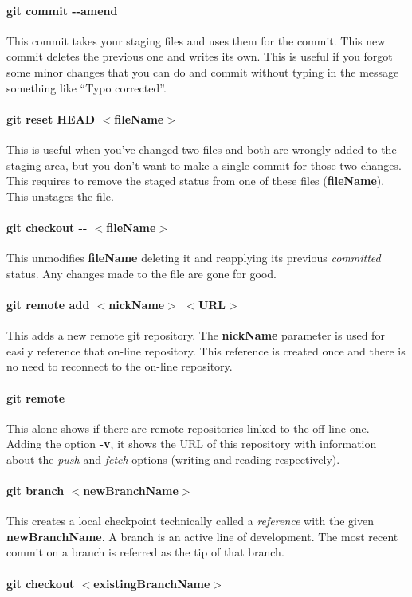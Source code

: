 \documentclass[a4paper, 12pt]{article}
\begin{document}
\paragraph{git commit -{}-amend} This commit takes your staging files and uses them for the commit. This new commit deletes the previous one and writes its own. This is useful if you forgot some minor changes that you can do and commit without typing in the message something like ``Typo corrected''.

\paragraph{git reset HEAD $<$fileName$>$} This is useful when you've changed two files and both are wrongly added to the staging area, but you don't want to make a single commit for those two changes. This requires to remove the staged status from one of these files (\textbf{fileName}). This unstages the file.

\paragraph{git checkout -{}- $<$fileName$>$} This unmodifies \textbf{fileName} deleting it and reapplying its previous \emph{committed} status. Any changes made to the file are gone for good.

\paragraph{git remote add $<$nickName$>$ $<$URL$>$}  This adds a new remote git repository. The \textbf{nickName} parameter is used for easily reference that on-line repository. This reference is created once and there is no need to reconnect to the on-line repository.

\paragraph{git remote} This alone shows if there are remote repositories linked to the off-line one. Adding the option \textbf{-v}, it shows the URL of this repository with information about the \emph{push} and \emph{fetch} options (writing and reading respectively).












\paragraph{git branch $<$newBranchName$>$}
This creates a local checkpoint technically called a \emph{reference} with the given \textbf{newBranchName}. A branch is an active line of development. The most recent commit on a branch is referred as the tip of that branch.

\paragraph{git checkout $<$existingBranchName$>$}
\end{document}
